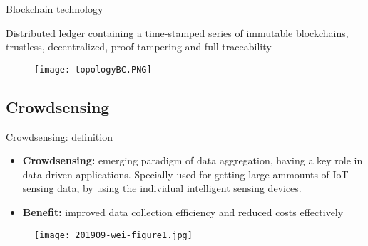\begin{frame}{Blockchain technology}
\begin{multicols}{2}
  \alert{Distributed ledger containing a time-stamped series of immutable blockchains, trustless, decentralized, proof-tampering and full traceability}
    \begin{figure}[h]
        \centering
        \texttt{[image: topologyBC.PNG]}
    \end{figure}
\end{multicols}
\end{frame}

\subsection{Crowdsensing}

\begin{frame}{Crowdsensing: definition}
  \begin{itemize}
  \item \textbf{Crowdsensing:} emerging paradigm of data aggregation, having a key role in data-driven applications. Specially used for getting large ammounts of IoT sensing data, by using the individual intelligent sensing devices.
  \item \textbf{Benefit:} improved data collection efficiency and reduced costs effectively
  \end{itemize}
  \begin{figure}[h]
        \centering
        \texttt{[image: 201909-wei-figure1.jpg]}
      \end{figure}
\end{frame}

